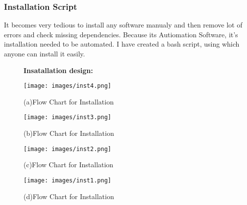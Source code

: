 \subsubsection{Installation Script}
It becomes very tedious to install any software manualy and then remove 
lot of errors and check missing dependencies. Because its Autiomation 
Software, it's installation needed to be automated. I have created a 
bash script, using which anyone can install it easily. \\
\newpage
\begin{figure}[h]

{\bf Insatallation design:}

\centering \texttt{[image: images/inst4.png]}
\caption{(a)Flow Chart for Installation}
\end{figure}
\newpage
\begin{figure}[h]
\centering \texttt{[image: images/inst3.png]}
\caption{(b)Flow Chart for Installation}
\end{figure}
\newpage
\newpage
\begin{figure}[h]
\centering \texttt{[image: images/inst2.png]}
\caption{(c)Flow Chart for Installation}
\end{figure}
\newpage
\begin{figure}[h]
\centering \texttt{[image: images/inst1.png]}
\caption{(d)Flow Chart for Installation}
\end{figure}
\newpage
